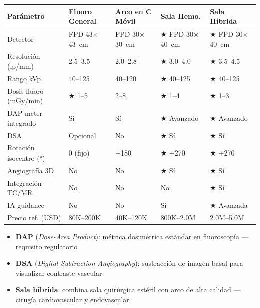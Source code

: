 \documentclass[11pt, a4paper]{article}
\begin{document}
\begin{center}
\renewcommand{\arraystretch}{1.25}
\begin{tabular}{P{4.2cm} C{2.5cm} C{2.5cm} C{2.5cm} C{2.5cm}}
\toprule
{}
\textbf{\color{white}Parámetro} &
\textbf{\color{white}Fluoro General} &
\textbf{\color{white}Arco en C Móvil} &
\textbf{\color{white}Sala Hemo.} &
\textbf{\color{white}Sala Híbrida} \\
\midrule
Detector                   & FPD 43$\times$43~cm & FPD 30$\times$30~cm & $\bigstar$ FPD 30$\times$40~cm & $\bigstar$ FPD 30$\times$40~cm \\
Resolución (lp/mm)         & 2.5--3.5 & 2.0--2.8 & $\bigstar$ 3.0--4.0 & $\bigstar$ 3.5--4.5 \\
Rango kVp                  & 40--125 & 40--120 & $\bigstar$ 40--125 & $\bigstar$ 40--125 \\
Dosis fluoro (mGy/min)     & $\bigstar$ 1--5 & 2--8 & $\bigstar$ 1--4 & $\bigstar$ 1--3 \\
DAP meter integrado        & Sí & Sí & $\bigstar$ Avanzado & $\bigstar$ Avanzado \\
DSA                        & Opcional & No & $\bigstar$ Sí & $\bigstar$ Sí \\
Rotación isocentro (°)     & 0 (fijo) & $\pm$180 & $\bigstar$ $\pm$270 & $\bigstar$ $\pm$270 \\
Angiografía 3D             & No & No & $\bigstar$ Sí & $\bigstar$ Sí \\
Integración TC/MR          & No & No & No & $\bigstar$ Sí \\
IA guidance                & No & No & Sí & $\bigstar$ Avanzada \\
Precio ref. (USD)          & 80K--200K & 40K--120K & 800K--2.0M & 2.0M--5.0M \\
\bottomrule
\end{tabular}
\end{center}

\begin{itemize}[leftmargin=*, itemsep=2pt, topsep=4pt]
  \footnotesize
  \item \textbf{DAP} (\textit{Dose-Area Product}): métrica dosimétrica estándar en fluoroscopía --- requisito regulatorio
  \item \textbf{DSA} (\textit{Digital Subtraction Angiography}): sustracción de imagen basal para visualizar contraste vascular
  \item \textbf{Sala híbrida}: combina sala quirúrgica estéril con arco de alta calidad --- cirugía cardiovascular y endovascular
\end{itemize}
\end{document}
